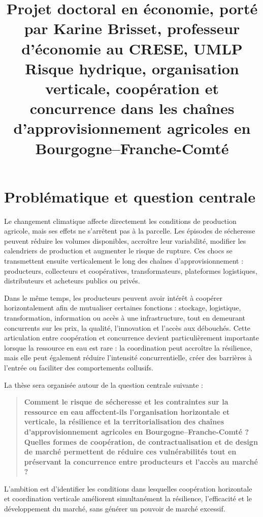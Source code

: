 \documentclass[11pt,a4paper]{article}
\title{Projet doctoral en économie, porté par Karine Brisset, professeur d'économie au CRESE, UMLP \\[0.5em]
\large Risque hydrique, organisation verticale, coopération et concurrence dans les chaînes d'approvisionnement agricoles en Bourgogne--Franche-Comté}
\author{}
\date{}
\begin{document}
\maketitle
\vspace{-1.3em}

\section{Problématique et question centrale}

Le changement climatique affecte directement les conditions de production agricole, mais ses effets ne s'arrêtent pas à la parcelle. Les épisodes de sécheresse peuvent réduire les volumes disponibles, accroître leur variabilité, modifier les calendriers de production et augmenter le risque de rupture. Ces chocs se transmettent ensuite verticalement le long des chaînes d'approvisionnement : producteurs, collecteurs et coopératives, transformateurs, plateformes logistiques, distributeurs et acheteurs publics ou privés.

Dans le même temps, les producteurs peuvent avoir intérêt à coopérer horizontalement afin de mutualiser certaines fonctions : stockage, logistique, transformation, information ou accès à une infrastructure, tout en demeurant concurrents sur les prix, la qualité, l'innovation et l'accès aux débouchés. Cette articulation entre coopération et concurrence devient particulièrement importante lorsque la ressource en eau est rare : la coordination peut accroître la résilience, mais elle peut également réduire l'intensité concurrentielle, créer des barrières à l'entrée ou faciliter des comportements collusifs.

La thèse sera organisée autour de la question centrale suivante :

\begin{quote}
\textbf{Comment le risque de sécheresse et les contraintes sur la ressource en eau affectent-ils l'organisation horizontale et verticale, la résilience et la territorialisation des chaînes d'approvisionnement agricoles en Bourgogne--Franche-Comté ? Quelles formes de coopération, de contractualisation et de design de marché permettent de réduire ces vulnérabilités tout en préservant la concurrence entre producteurs et l'accès au marché ?}
\end{quote}

L'ambition est d'identifier les conditions dans lesquelles coopération horizontale et coordination verticale améliorent simultanément la résilience, l'efficacité et le développement du marché, sans générer un pouvoir de marché excessif.
\end{document}
